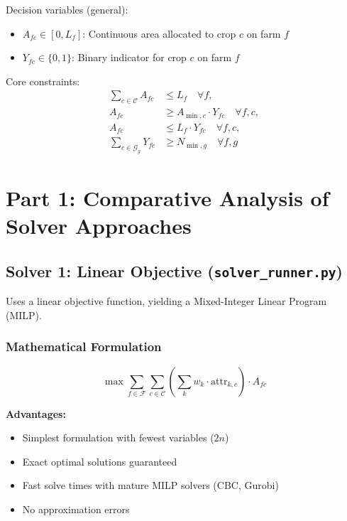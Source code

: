 \documentclass[11pt,a4paper]{article}
\begin{document}
Decision variables (general):
\begin{itemize}
    \item $A_{fc} \in [0, L_f]$: Continuous area allocated to crop $c$ on farm $f$
    \item $Y_{fc} \in \{0,1\}$: Binary indicator for crop $c$ on farm $f$
\end{itemize}

Core constraints:
\begin{align}
\sum_{c \in \mathcal{C}} A_{fc} &\leq L_f \quad \forall f, \\
A_{fc} &\geq A_{\min,c} \cdot Y_{fc} \quad \forall f,c, \\
A_{fc} &\leq L_f \cdot Y_{fc} \quad \forall f,c, \\
\sum_{c \in \mathcal{G}_g} Y_{fc} &\geq N_{\min,g} \quad \forall f,g
\end{align}

\section{Part 1: Comparative Analysis of Solver Approaches}

\subsection{Solver 1: Linear Objective (\texttt{solver\_runner.py})}

Uses a linear objective function, yielding a Mixed-Integer Linear Program (MILP).

\subsubsection{Mathematical Formulation}

\begin{equation}
\max \sum_{f \in \mathcal{F}} \sum_{c \in \mathcal{C}} \left(\sum_{k} w_k \cdot \text{attr}_{k,c}\right) \cdot A_{fc}
\end{equation}

\textbf{Advantages:}
\begin{itemize}
    \item Simplest formulation with fewest variables ($2n$)
    \item Exact optimal solutions guaranteed
    \item Fast solve times with mature MILP solvers (CBC, Gurobi)
    \item No approximation errors
\end{itemize}
\end{document}
